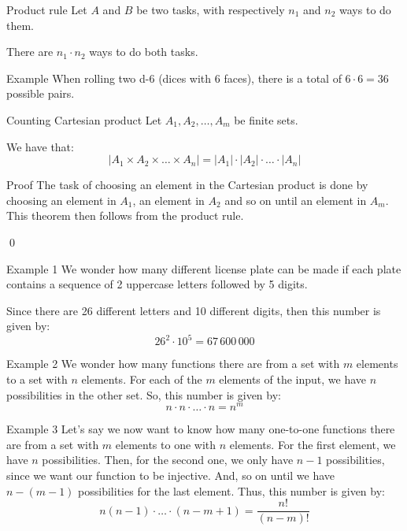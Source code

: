 \documentclass[a4paper]{article}
\begin{document}
\begin{parag}{Product rule}
    Let $A$ and $B$ be two tasks, with respectively $n_1$ and $n_2$ ways to do them.

    There are $n_1 \cdot n_2$ ways to do both tasks.
\end{parag}

\begin{parag}{Example}
    When rolling two d-6 (dices with 6 faces), there is a total of $6\cdot 6 = 36$ possible pairs.
\end{parag}

\begin{parag}{Counting Cartesian product}
    Let $A_1, A_2, \ldots, A_m$ be finite sets. 

    We have that:
    \[\left|A_1 \times A_2 \times \ldots \times A_n\right| = \left|A_1\right|\cdot \left|A_2\right| \cdot \ldots \cdot \left|A_n\right|\] 

    \begin{subparag}{Proof}
        The task of choosing an element in the Cartesian product is done by choosing an element in $A_1$, an element in $A_2$ and so on until an element in $A_m$. This theorem then follows from the product rule.
 
        \qed
    \end{subparag}
\end{parag}

\begin{parag}{Example 1}
    We wonder how many different license plate can be made if each plate contains a sequence of 2 uppercase letters followed by 5 digits.

    Since there are 26 different letters and 10 different digits, then this number is given by: 
    \[26^2 \cdot 10^5 = 67\,600\,000\]
\end{parag}

\begin{parag}{Example 2}
    We wonder how many functions there are from a set with $m$ elements to a set with $n$ elements. For each of the $m$ elements of the input, we have $n$ possibilities in the other set. So, this number is given by: 
    \[n\cdot n\cdot \ldots \cdot n = n^m\]
\end{parag}

\begin{parag}{Example 3}
    Let's say we now want to know how many one-to-one functions there are from a set with $m$ elements to one with $n$ elements. For the first element, we have $n$ possibilities. Then, for the second one, we only have $n-1$ possibilities, since we want our function to be injective. And, so on until we have $n - \left(m - 1\right)$ possibilities for the last element. Thus, this number is given by:
    \[n\left(n-1\right)\cdot\ldots\cdot\left(n - m + 1\right) = \frac{n!}{\left(n - m\right)!}\]
\end{parag}
\end{document}
